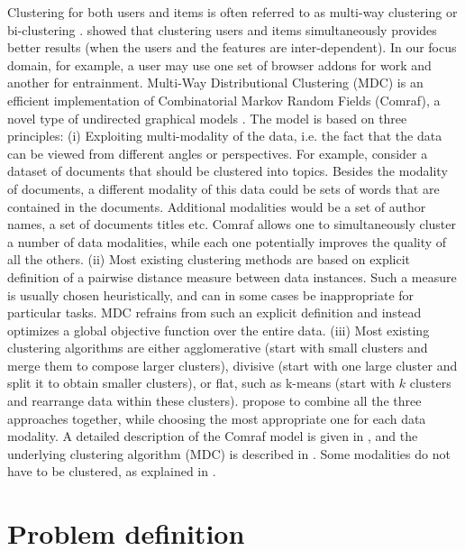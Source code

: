 \documentclass[11pt,oneside]{book}
\begin{document}
Clustering for both users and items is often
referred to as multi-way clustering \citep{bekkerman05} or bi-clustering \citep{zhu2009analyzing}.
\cite{bekkerman05} showed that clustering users and items
simultaneously provides better results (when the users and the
features are inter-dependent). In our focus domain, for example, a
user may use one set of browser addons for work and another for
entrainment. Multi-Way Distributional Clustering (MDC) is an efficient
implementation of Combinatorial Markov Random Fields (Comraf), a novel
type of undirected graphical models \citep{bekkerman2006semi}. The
model is based on three principles: (i) Exploiting multi-modality
of the data, i.e. the fact that the data can be viewed from different
angles or perspectives. For example, consider a dataset of documents
that should be clustered into topics. Besides the modality of
documents, a different modality of this data could be sets of words
that are contained in the documents. Additional modalities would be a
set of author names, a set of documents titles etc. Comraf allows one
to simultaneously cluster a number of data modalities, while each one
potentially improves the quality of all the others. (ii) Most existing
clustering methods are based on explicit definition of a pairwise
distance measure between data instances. Such a measure is usually
chosen heuristically, and can in some cases be inappropriate for
particular tasks. MDC refrains from such an explicit definition and
instead optimizes a global objective function over the entire
data. (iii) Most existing clustering algorithms are either
agglomerative (start with small clusters and merge them to compose
larger clusters), divisive (start with one large cluster and split it
to obtain smaller clusters), or flat, such as k-means (start with $k$
clusters and rearrange data within these clusters). \citep{bekkerman05} propose to combine all the three approaches together, while
choosing the most appropriate one for each data modality. A detailed
description of the Comraf model is given in \citep{bekkerman2006semi}, and
the underlying clustering algorithm (MDC) is described in \citep{bekkerman05}. Some modalities do not have to be clustered, as explained
in \citep{bekkerman2007multi}. 

\chapter{Problem definition}
\end{document}
